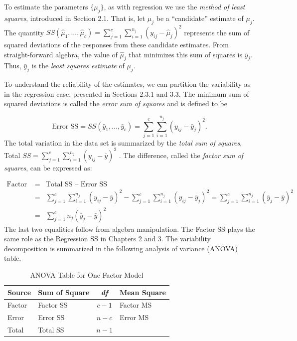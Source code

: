 To estimate the parameters $\{\mu_j\}$, as with regression we use
the \textit{method of least squares}, introduced in Section 2.1.
That is, let $\hat{\mu}_j$ be a ``candidate'' estimate of $\mu_j$.
The quantity $ SS(\hat{\mu}_1, \ldots , \hat{\mu}_{c}) =
\sum_{j=1}^{c} \sum_{i=1}^{n_j} (y_{ij}-\hat{\mu}_j)^2 $ represents
the sum of squared deviations of the responses from these candidate
estimates. From straight-forward algebra, the value of $\hat{\mu}_j$
that minimizes this sum of squares is $\bar{y}_j$. Thus, $\bar{y}_j$
is the \textit{least squares estimate }of $\mu _j$.


To understand the reliability of the estimates, we can partition the
variability as in the regression case, presented in Sections 2.3.1
and 3.3. The minimum sum of squared deviations is called the
\textit{error sum of squares} and is defined to be

\begin{equation*}
\text{Error SS} = SS(\bar{y}_1, \ldots, \bar{y}_{c}) =
\sum_{j=1}^{c} \sum_{i=1}^{n_j} \left(y_{ij}-\bar{y}_j \right)^2 .
\end{equation*}
The total variation in the data set is summarized by the
\textit{total sum of squares}, Total
$SS=\sum_{j=1}^{c}\sum_{i=1}^{n_j}(y_{ij}-\bar{y})^2$ . The
difference, called the \textit{factor sum of} \textit{squares}, can
be expressed as:

\begin{eqnarray*}
\textrm{Factor SS }&=& \textrm{Total SS -- Error SS} \\
&=& \sum_{j=1}^{c}\sum_{i=1}^{n_j}(y_{ij}-\bar{y})^2-\sum_{j=1}^{c}%
\sum_{i=1}^{n_j}(y_{ij}-\bar{y}_j)^2=\sum_{j=1}^{c}\sum_{i=1}^{n_j}(%
\bar{y}_j-\bar{y})^2 \\
&=& \sum_{j=1}^{c}n_j(\bar{y}_j-\bar{y})^2
\end{eqnarray*}
The last two equalities follow from algebra manipulation. The Factor
SS plays the same role as the Regression SS in Chapters 2 and 3. The
variability decomposition is summarized in the following analysis of
variance (ANOVA) table.

\begin{table}[h]
\caption{\label{T4:ANOVAOneFactor} ANOVA Table for One Factor Model}
\begin{tabular}{llcl}
\hline Source & Sum of Square & \textit{df} & Mean Square \\
\hline
Factor & Factor SS & $c-1$ & Factor MS \\
Error  & Error SS  & $n-c$ & Error MS \\
Total  & Total SS  & $n-1$ & \\
\hline
\end{tabular}
\end{table}

